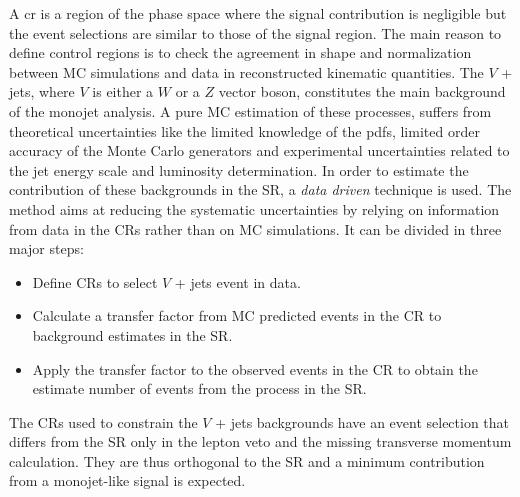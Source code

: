 A \gls{cr} is a region of the phase space where the signal contribution is
negligible but the event selections are similar to those of the signal
region. The main reason to define control regions is to check the agreement in
shape and normalization between MC simulations and data in reconstructed
kinematic quantities. The $V$ + jets, where $V$ is either a $W$ or a $Z$ vector
boson, constitutes the main background of the monojet analysis. A pure MC
estimation of these processes, suffers from theoretical uncertainties like the
limited knowledge of the \glspl{pdf}, limited order accuracy of the Monte Carlo
generators and experimental uncertainties related to the jet energy scale and
luminosity determination. In order to estimate the contribution of these
backgrounds in the SR, a \emph{data driven} technique is used. The method aims
at reducing the systematic uncertainties by relying on information from data in
the CRs rather than on MC simulations. It can be divided in three major steps:
\begin{itemize}
\item Define CRs to select $V$ + jets event in data.
\item Calculate a transfer factor from MC predicted events in the CR to
  background estimates in the SR\@.
\item Apply the transfer factor to the observed events in the CR to obtain the
  estimate number of events from the process in the SR\@.
\end{itemize}
The CRs used to constrain the $V$ + jets backgrounds have an event selection
that differs from the SR only in the lepton veto and the missing transverse
momentum calculation. They are thus orthogonal to the SR and a minimum
contribution from a monojet-like signal is expected.
